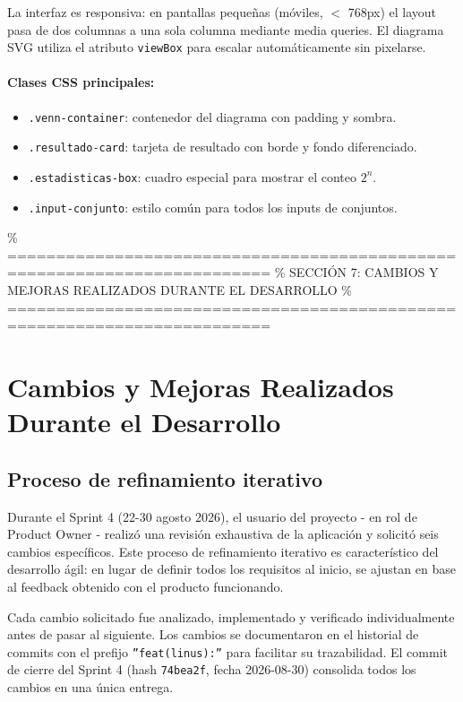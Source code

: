 \documentclass[11pt,a4paper]{article}
\begin{document}
La interfaz es responsiva: en pantallas pequeñas (móviles, $<$ 768px) el layout pasa de dos columnas a una sola columna mediante media queries. El diagrama SVG utiliza el atributo \texttt{viewBox} para escalar automáticamente sin pixelarse.

\paragraph{Clases CSS principales:}
\begin{itemize}[noitemsep]
    \item \texttt{.venn-container}: contenedor del diagrama con padding y sombra.
    \item \texttt{.resultado-card}: tarjeta de resultado con borde y fondo diferenciado.
    \item \texttt{.estadisticas-box}: cuadro especial para mostrar el conteo $2^n$.
    \item \texttt{.input-conjunto}: estilo común para todos los inputs de conjuntos.
\end{itemize}

\newpage

\% =========================================================================
\% SECCIÓN 7: CAMBIOS Y MEJORAS REALIZADOS DURANTE EL DESARROLLO
\% =========================================================================
\section{Cambios y Mejoras Realizados Durante el Desarrollo}

\subsection{Proceso de refinamiento iterativo}
Durante el Sprint 4 (22-30 agosto 2026), el usuario del proyecto - en rol de Product Owner - realizó una revisión exhaustiva de la aplicación y solicitó seis cambios específicos. Este proceso de refinamiento iterativo es característico del desarrollo ágil: en lugar de definir todos los requisitos al inicio, se ajustan en base al feedback obtenido con el producto funcionando.

Cada cambio solicitado fue analizado, implementado y verificado individualmente antes de pasar al siguiente. Los cambios se documentaron en el historial de commits con el prefijo \texttt{''feat(linus):''} para facilitar su trazabilidad. El commit de cierre del Sprint 4 (hash \texttt{74bea2f}, fecha 2026-08-30) consolida todos los cambios en una única entrega.
\end{document}
